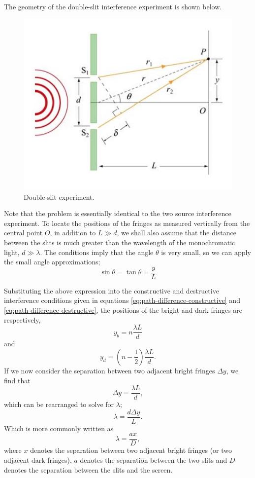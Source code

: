 The geometry of the double-slit interference experiment is shown below.
\begin{figure}[h!]
    \centering
    \includegraphics[scale=0.6]{notes/images/Interference-Single-Source-2.JPG}
    \caption{Double-slit experiment.}
\end{figure}
\FloatBarrier

Note that the problem is essentially identical to the two source interference experiment. To locate the positions of the fringes as measured vertically from the central point $O$, in addition to $L \gg d$, we shall also assume that the distance between the slits is much greater than the wavelength of the monochromatic light, $d \gg \lambda$. The conditions imply that the angle $\theta$ is very small, so we can apply the small angle approximations;
\begin{equation*}
    \sin \theta = \tan \theta = \frac{y}{L}
\end{equation*}

Substituting the above expression into the constructive and destructive interference conditions given in equations \ref{eq:path-difference-constructive} and \ref{eq:path-difference-destructive}, the positions of the bright and dark fringes are respectively,
\begin{equation}
    y_b = n \frac{\lambda L}{d}
\end{equation}
and
\begin{equation}
    y_d = \left(n - \frac{1}{2}\right) \frac{\lambda L}{d}.
\end{equation}
If we now consider the separation between two adjacent bright fringes $\Delta y$, we find that
\begin{equation*}
    \Delta y = \frac{\lambda L}{d},
\end{equation*}
which can be rearranged to solve for $\lambda$;
\begin{equation}
    \lambda = \frac{d \Delta y}{L}.
\end{equation}
Which is more commonly written as
\begin{equation}
    \lambda = \frac{ax}{D},
\end{equation}
where $x$ denotes the separation between two adjacent bright fringes (or two adjacent dark fringes), $a$ denotes the separation between the two slits and $D$ denotes the separation between the slits and the screen.